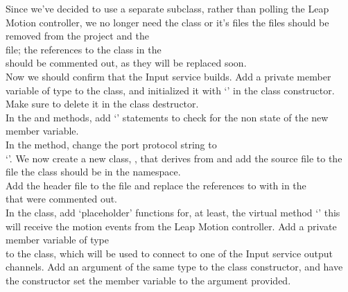 Since we've decided to use a separate  subclass, rather than
polling the Leap Motion controller, we no longer need the 
class or it's files \longDash{} the files should be removed from the project and the\\
 file; the references to the
 class in the\\
 should be commented out, as they will be replaced soon.\\

Now we should confirm that the Input service builds.
\tertiaryEnd
{}
Add a private member variable of type  to the
 class, and initialized it with
`' in the class constructor.
Make sure to delete it in the class destructor.\\

In the  and
 methods, add `' statements to
check for the non\longDash{} state of the new member variable.\\

In the  method, change the
port protocol string to\\
`'.
\tertiaryEnd
{}
We now create a new  class, , that derives
from  and add the source file to the
 file \longDash{} the class should be in the
 namespace.\\

Add the header file  to the file
 and replace the references to
 with  in the\\
 that were commented out.\\

In the  class, add `placeholder' functions for, at least,
the virtual method `' \longDash{} this will receive the motion events from
the Leap Motion controller.
Add a private member variable of type\\
 to the class, which will be used to connect to one of
the Input service output channels.
Add an argument of the same type to the class constructor, and have the constructor set
the member variable to the argument provided.\\

